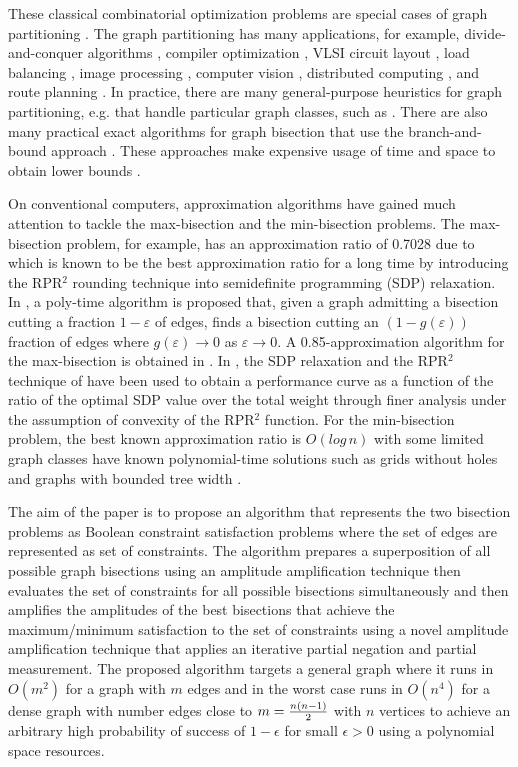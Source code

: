 \documentclass[a4paper]{article}
\begin{document}
These classical combinatorial optimization problems are special cases of graph partitioning \cite{Ref25}. 
The graph partitioning has many applications, for example, divide-and-conquer algorithms \cite{Ref50}, 
compiler optimization \cite{Ref39}, VLSI circuit layout \cite{Ref8}, load balancing \cite{Ref33}, image processing \cite{Ref62}, 
computer vision \cite{Ref46}, distributed computing \cite{Ref51}, and route planning \cite{Ref19}. In practice, 
there are many general-purpose heuristics for graph partitioning, e.g. \cite{Ref31,Ref58,Ref59} 
that handle particular graph classes, such as \cite{Ref53,Ref16,Ref59}. There are also many practical exact algorithms 
for graph bisection that use the branch-and-bound approach \cite{Ref47,Delling2014}. 
These approaches make expensive usage of time and space to obtain lower bounds \cite{Ref1,Ref3,Ref30,Delling2014}.

On conventional computers, approximation algorithms have gained much attention to tackle the max-bisection and the min-bisection problems.
The max-bisection problem, for example, has an approximation ratio of 0.7028 due to \cite{Feige2006} which is known to be 
the best approximation ratio for a long time by introducing the RPR$^2$ rounding technique into semidefinite programming (SDP) 
relaxation. In \cite{Guruswami2011}, a poly-time algorithm is proposed that, given a graph admitting a bisection cutting a fraction 
$1-\varepsilon$ of edges, finds a bisection cutting an $(1-g(\varepsilon))$ fraction of edges where 
$g(\varepsilon) \to 0$ as $\varepsilon \to 0$. A 0.85-approximation algorithm for the max-bisection is obtained in 
\cite{Raghavendra2012}. In \cite{ZiXu2014}, the SDP relaxation and the RPR$^2$ technique of \cite{Feige2006} 
have been used to obtain a performance curve as a function of the ratio of the optimal SDP value over the total
weight through finer analysis under the assumption of convexity of the RPR$^2$ function. For the min-bisection problem, 
the best known approximation ratio is $O(log\,n)$ \cite{Ref55} 
with some limited graph classes have known polynomial-time solutions such as grids without holes \cite{Ref22}
and graphs with bounded tree width \cite{Ref37}. 


The aim of the paper is to propose an algorithm that represents the two bisection problems as Boolean constraint 
satisfaction problems where the set of edges are represented as set of constraints. 
The algorithm prepares a superposition of all possible graph bisections using an amplitude 
amplification technique then evaluates the set of constraints for all possible bisections simultaneously and then amplifies 
the amplitudes of the best bisections that achieve the maximum/minimum satisfaction to the set of constraints 
using a novel amplitude amplification technique that applies an iterative partial negation and partial measurement. 
The proposed algorithm targets a general graph where it runs in $O(m^2)$ for a graph with $m$ edges and in the worst case 
runs in $O(n^4)$ for a dense graph with number edges close to $m = {\textstyle{{n(n - 1)} \over 2}}$ with $n$ vertices 
to achieve an arbitrary high probability of success of $1-\epsilon$ for small $\epsilon>0$ using a polynomial space resources.
\end{document}
